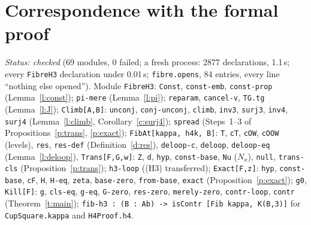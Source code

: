 \documentclass[11pt]{amsart}
\theoremstyle{definition}
\theoremstyle{remark}
\newcommand{\code}[1]{\texttt{#1}}
\begin{document}
\section{Correspondence with the formal proof}\label{sec:corr}
\emph{Status: checked} (69 modules, 0 failed; a fresh process: 2877
declarations, 1.1\,s; every \code{FibreH3} declaration under 0.01\,s;
\code{fibre.opens}, 84 entries, every line ``nothing else opened'').
Module \code{FibreH3}: \code{Const}, \code{const-emb}, \code{const-prop}
(Lemma~\ref{l:const}); \code{pi-mere} (Lemma~\ref{l:pi});
\code{reparam}, \code{cancel-v}, \code{TG.tg} (Lemma~\ref{l:J});
\code{Climb[A,B]}: \code{unconj}, \code{conj-unconj}, \code{climb},
\code{inv3}, \code{surj3}, \code{inv4}, \code{surj4}
(Lemma~\ref{l:climb}, Corollary~\ref{c:surj4}); \code{spread} (Steps~1--3
of Propositions~\ref{p:trans}, \ref{p:exact});
\code{FibAt[kappa, h4k, B]}: \code{T}, \code{cT}, \code{cOW}, \code{cOOW}
(levels), \code{res}, \code{res-def} (Definition~\ref{d:res}),
\code{deloop-c}, \code{deloop}, \code{deloop-eq} (Lemma~\ref{l:deloop}),
\code{Trans[F,G,w]}: \code{Z}, \code{d}, \code{hyp}, \code{const-base},
\code{Nu} ($N_x$), \code{null}, \code{trans-cls}
(Proposition~\ref{p:trans}); \code{h3-loop} ((H3) transferred);
\code{Exact[F,z]}: \code{hyp}, \code{const-base}, \code{cF}, \code{H},
\code{H-eq}, \code{zeta}, \code{base-zero}, \code{from-base}, \code{exact}
(Proposition~\ref{p:exact}); \code{g0}, \code{Kill[F]}: \code{g},
\code{cls-eq}, \code{g-eq}, \code{G-zero}, \code{res-zero},
\code{merely-zero}, \code{contr-loop}, \code{contr}
(Theorem~\ref{t:main}); \code{fib-h3 : (B : Ab) -> isContr [Fib kappa, K(B,3)]}
for \code{CupSquare.kappa} and \code{H4Proof.h4}.
\end{document}
